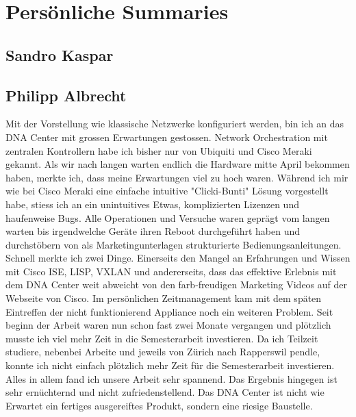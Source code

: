 \section{Persönliche Summaries}
\subsection{Sandro Kaspar}

\subsection{Philipp Albrecht}
Mit der Vorstellung wie klassische Netzwerke konfiguriert werden, bin ich an das DNA Center mit grossen Erwartungen gestossen. Network Orchestration mit zentralen Kontrollern habe ich bisher nur von Ubiquiti und Cisco Meraki gekannt. Als wir nach langen warten endlich die Hardware mitte April bekommen haben, merkte ich, dass meine Erwartungen viel zu hoch waren. Während ich mir wie bei Cisco Meraki eine einfache intuitive "Clicki-Bunti" Lösung vorgestellt habe, stiess ich an ein unintuitives Etwas, komplizierten Lizenzen und haufenweise Bugs. Alle Operationen und Versuche waren geprägt vom langen warten bis irgendwelche Geräte ihren Reboot durchgeführt haben und durchstöbern von als Marketingunterlagen strukturierte Bedienungsanleitungen. Schnell merkte ich zwei Dinge. Einerseits den Mangel an Erfahrungen und Wissen mit Cisco ISE, LISP, VXLAN und andererseits, dass das effektive Erlebnis mit dem DNA Center weit abweicht von den farb-freudigen Marketing Videos auf der Webseite von Cisco. 
Im persönlichen Zeitmanagement kam mit dem späten Eintreffen der nicht funktionierend Appliance noch ein weiteren Problem. Seit beginn der Arbeit waren nun schon fast zwei Monate vergangen und plötzlich musste ich viel mehr Zeit in die Semesterarbeit investieren. Da ich Teilzeit studiere, nebenbei Arbeite und jeweils von Zürich nach Rapperswil pendle, konnte ich nicht einfach plötzlich mehr Zeit für die Semesterarbeit investieren. 
Alles in allem fand ich unsere Arbeit sehr spannend. Das Ergebnis hingegen ist sehr ernüchternd und nicht zufriedenstellend. Das DNA Center ist nicht wie Erwartet ein fertiges ausgereiftes Produkt, sondern eine riesige Baustelle.

